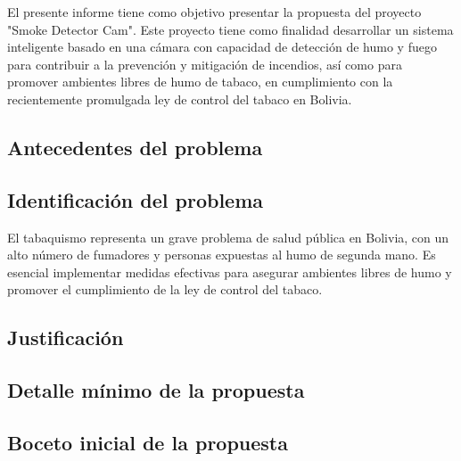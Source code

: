 El presente informe tiene como objetivo presentar la propuesta del proyecto "Smoke Detector Cam". Este proyecto tiene como finalidad desarrollar un sistema inteligente basado en una cámara con capacidad de detección de humo y fuego para contribuir a la prevención y mitigación de incendios, así como para promover ambientes libres de humo de tabaco, en cumplimiento con la recientemente promulgada ley de control del tabaco en Bolivia.

\needspace{3cm}
\subsection{Antecedentes del problema}


\needspace{3cm}
\subsection{Identificación del problema}

El tabaquismo representa un grave problema de salud pública en Bolivia, con un alto número de fumadores y personas expuestas al humo de segunda mano. Es esencial implementar medidas efectivas para asegurar ambientes libres de humo y promover el cumplimiento de la ley de control del tabaco.

\needspace{4cm}
\subsection{Justificación} 


\needspace{3cm}
\subsection{Detalle mínimo de la propuesta}


\needspace{3cm}
\subsection{Boceto inicial de la propuesta}

